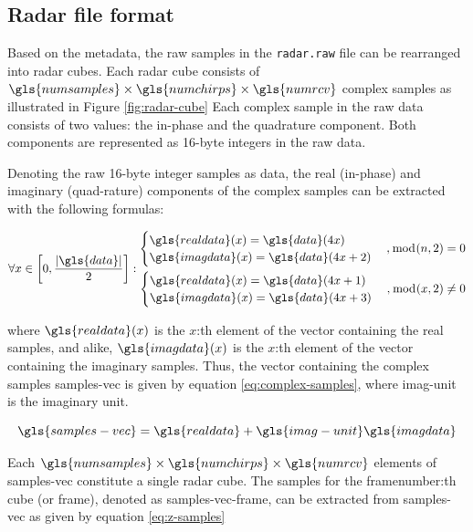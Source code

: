 \subsection{Radar file format}
\label{sec:radar-data}

Based on the metadata, the raw samples in the \texttt{radar.raw} file can be rearranged into radar cubes.
Each radar cube consists of $\gls{numsamples} \times \gls{numchirps} \times \gls{numrcv}$ complex samples as illustrated in Figure \ref{fig:radar-cube}
Each complex sample in the raw data consists of two values: the in-phase and the quadrature component.
Both components are represented as 16-byte integers in the raw data.

Denoting the raw 16-byte integer samples as \gls{data}, the real (in-phase) and imaginary (quad-rature) components
of the complex samples can be extracted with the following formulas:

\begin{equation}
    \forall x \in \left[ 0, \frac{| \gls{data} |}{2} \right] : \begin{split}
        \begin{cases}
            \gls{realdata}(x) = \gls{data} (4x) \\
            \gls{imagdata}(x) = \gls{data} (4x+2)
        \end{cases} ,\bmod(n, 2) = 0 \\
        \begin{cases}
            \gls{realdata}(x) = \gls{data} (4x+1) \\
            \gls{imagdata}(x) = \gls{data} (4x+3)
        \end{cases} ,\bmod(x, 2) \neq 0
    \end{split}
\end{equation}

where $\gls{realdata}(x)$ is the $x$:th element of the vector containing the real samples,
and alike, $\gls{imagdata}(x)$ is the $x$:th element of the vector containing the imaginary samples.
Thus, the vector containing the complex samples \gls{samples-vec} is given by equation \ref{eq:complex-samples}, where \gls{imag-unit} is the imaginary unit.

\begin{equation}
    \label{eq:complex-samples}
    \gls{samples-vec} = \gls{realdata} + \gls{imag-unit} \gls{imagdata}
\end{equation}

Each $\gls{numsamples} \times \gls{numchirps} \times \gls{numrcv}$ elements of \gls{samples-vec} constitute a single radar cube.
The samples for the \gls{framenumber}:th cube (or frame), denoted as \gls{samples-vec-frame}, can be extracted from \gls{samples-vec} as given by equation \ref{eq:z-samples} 

